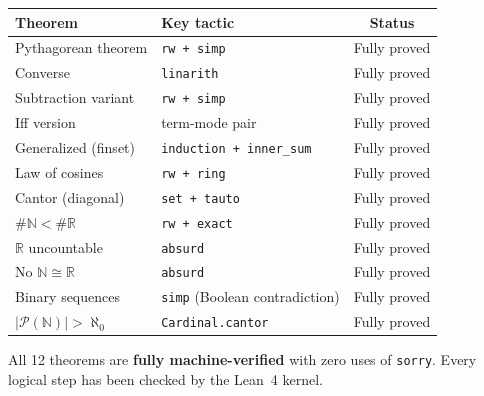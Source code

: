 \documentclass[11pt]{article}
\theoremstyle{plain}
\theoremstyle{definition}
\begin{document}
\begin{center}
\begin{tabular}{llc}
\hline
\textbf{Theorem} & \textbf{Key tactic} & \textbf{Status} \\
\hline
Pythagorean theorem & \texttt{rw + simp} & Fully proved \\
Converse & \texttt{linarith} & Fully proved \\
Subtraction variant & \texttt{rw + simp} & Fully proved \\
Iff version & term-mode pair & Fully proved \\
Generalized (finset) & \texttt{induction + inner\_sum} & Fully proved \\
Law of cosines & \texttt{rw + ring} & Fully proved \\
\hline
Cantor (diagonal) & \texttt{set + tauto} & Fully proved \\
$\#\mathbb{N} < \#\mathbb{R}$ & \texttt{rw + exact} & Fully proved \\
$\mathbb{R}$ uncountable & \texttt{absurd} & Fully proved \\
No $\mathbb{N} \cong \mathbb{R}$ & \texttt{absurd} & Fully proved \\
Binary sequences & \texttt{simp} (Boolean contradiction) & Fully proved \\
$|\mathcal{P}(\mathbb{N})| > \aleph_0$ & \texttt{Cardinal.cantor} & Fully proved \\
\hline
\end{tabular}
\end{center}

All 12 theorems are \textbf{fully machine-verified} with zero uses of
\texttt{sorry}. Every logical step has been checked by the Lean~4 kernel.
\end{document}
